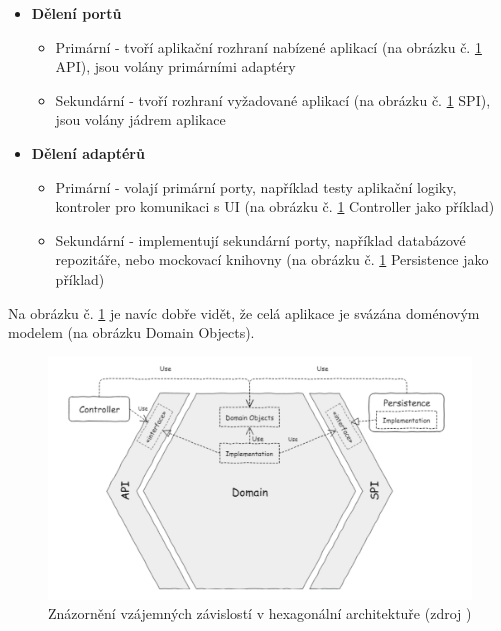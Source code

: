 \begin{itemize}
    \item \textbf{Dělení portů}
        \begin{itemize}
            \item Primární - tvoří aplikační rozhraní nabízené aplikací (na obrázku č. \ref{fig:dependency-hexagon} API), jsou volány primárními adaptéry \cite{bergen} \cite{hexagonal-this}
            \item Sekundární - tvoří rozhraní vyžadované aplikací (na obrázku č. \ref{fig:dependency-hexagon} SPI), jsou volány jádrem aplikace \cite{bergen} \cite{hexagonal-this}
        \end{itemize}
    \item \textbf{Dělení adaptérů}
        \begin{itemize}
            \item Primární - volají primární porty, například testy aplikační logiky, kontroler pro komunikaci s UI (na obrázku č. \ref{fig:dependency-hexagon} Controller jako příklad) \cite{bergen}
            \item Sekundární - implementují sekundární porty, například databázové repozitáře, nebo mockovací knihovny (na obrázku č. \ref{fig:dependency-hexagon} Persistence jako příklad)\cite{bergen}
        \end{itemize}
\end{itemize}
Na obrázku č. \ref{fig:dependency-hexagon} je navíc dobře vidět, že celá aplikace je svázána doménovým modelem (na obrázku Domain Objects). \par
\begin{figure}[H]
	\includegraphics[width=\linewidth]{img/hexagon-dependency.png}
	\caption{Znázornění vzájemných závislostí v hexagonální architektuře (zdroj \cite{beyondxscratch})}
	\label{fig:dependency-hexagon}
\end{figure}
